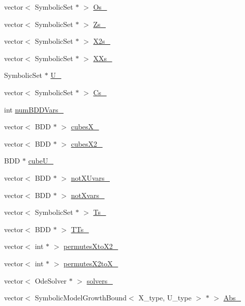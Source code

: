 \begin{DoxyCompactItemize}
\item 
vector$<$ Symbolic\+Set $\ast$ $>$ \hyperlink{classscots_1_1Adaptive_abed6bfd1256157d4b943078f6486ee36}{Os\+\_\+}
\item 
vector$<$ Symbolic\+Set $\ast$ $>$ \hyperlink{classscots_1_1Adaptive_a387e00a300c8c75d3a4eb6181dfab9c4}{Zs\+\_\+}
\item 
vector$<$ Symbolic\+Set $\ast$ $>$ \hyperlink{classscots_1_1Adaptive_a532d1acf3db0235c7bbd551b41a040fc}{X2s\+\_\+}
\item 
vector$<$ Symbolic\+Set $\ast$ $>$ \hyperlink{classscots_1_1Adaptive_a3c52621889e3ea22c888c93cd14e5a76}{X\+Xs\+\_\+}
\item 
Symbolic\+Set $\ast$ \hyperlink{classscots_1_1Adaptive_a89fa563cfea5b9a7bec6a705ca412a18}{U\+\_\+}
\item 
vector$<$ Symbolic\+Set $\ast$ $>$ \hyperlink{classscots_1_1Adaptive_a4937d441ac9758f33bcceeb9975fb1ce}{Cs\+\_\+}
\item 
int \hyperlink{classscots_1_1Adaptive_a753d83283386610f1a2283af5cbeba73}{num\+B\+D\+D\+Vars\+\_\+}
\item 
vector$<$ B\+DD $\ast$ $>$ \hyperlink{classscots_1_1Adaptive_ac82296bd0392bccf2a0e4af9ba70ff37}{cubes\+X\+\_\+}
\item 
vector$<$ B\+DD $\ast$ $>$ \hyperlink{classscots_1_1Adaptive_a6fa7b7542b91ec37ff2358359e425d12}{cubes\+X2\+\_\+}
\item 
B\+DD $\ast$ \hyperlink{classscots_1_1Adaptive_a0332230a9bad14d432e6651611863be9}{cube\+U\+\_\+}
\item 
vector$<$ B\+DD $\ast$ $>$ \hyperlink{classscots_1_1Adaptive_ac3f203003011bcea5176ef294ab7a8a0}{not\+X\+Uvars\+\_\+}
\item 
vector$<$ B\+DD $\ast$ $>$ \hyperlink{classscots_1_1Adaptive_a8fbbf6976e589506c9e4c38045196c07}{not\+Xvars\+\_\+}
\item 
vector$<$ Symbolic\+Set $\ast$ $>$ \hyperlink{classscots_1_1Adaptive_ab9f37fda9e698b797079d28b243f3a5b}{Ts\+\_\+}
\item 
vector$<$ B\+DD $\ast$ $>$ \hyperlink{classscots_1_1Adaptive_a1f4c02094ecd380887640c83fc1d0310}{T\+Ts\+\_\+}
\item 
vector$<$ int $\ast$ $>$ \hyperlink{classscots_1_1Adaptive_ae954d4d3177bdc4093530e254ace2b34}{permutes\+Xto\+X2\+\_\+}
\item 
vector$<$ int $\ast$ $>$ \hyperlink{classscots_1_1Adaptive_a88edb6662310c07120d07c9dff968ddc}{permutes\+X2to\+X\+\_\+}
\item 
vector$<$ Ode\+Solver $\ast$ $>$ \hyperlink{classscots_1_1Adaptive_a0b300511b5f746c7b24ead30dc0ca9ac}{solvers\+\_\+}
\item 
vector$<$ Symbolic\+Model\+Growth\+Bound$<$ X\+\_\+type, U\+\_\+type $>$ $\ast$ $>$ \hyperlink{classscots_1_1Adaptive_ab51fe5639ecc8fd046c1d2d56fb25890}{Abs\+\_\+}
\end{DoxyCompactItemize}



